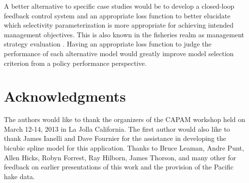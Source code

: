 \documentclass[review,letterpaper,10pt,authoryear]{elsarticle}
\begin{document}

A better alternative to specific case studies would be to develop a closed-loop feedback control system and an appropriate loss function to better elucidate which selectivity parameterization is more appropriate for achieving intended management objectives.  This is also known in the fisheries realm as management strategy evaluation \citep{de1986simulation,Cooke1999,smith1999implementing}.  Having an appropriate loss function to judge the performance of each alternative model would greatly improve model selection criterion from a policy performance perspective.


\section*{Acknowledgments} %
\label{sec:acknowledgments}
	The authors would like to thank the organizers of the CAPAM workshop held on March 12-14, 2013 in La Jolla California.  The first author would also like to thank James Ianelli and Dave Fournier for the assistance in developing the bicubic spline model for this application.  Thanks to Bruce Leaman, Andre Punt, Allen Hicks, Robyn Forrest, Ray Hilborn, James Thorson, and many other for feedback on earlier presentations of this work and the provision of the Pacific hake data.


	
	
	
\end{document}
